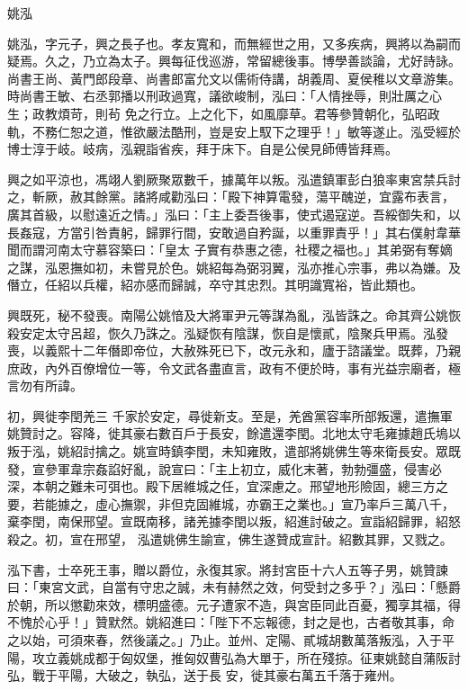
\begin{pinyinscope}

 姚泓



 姚泓，字元子，興之長子也。孝友寬和，而無經世之用，又多疾病，興將以為嗣而疑焉。久之，乃立為太子。興每征伐巡游，常留總後事。博學善談論，尤好詩詠。尚書王尚、黃門郎段章、尚書郎富允文以儒術侍講，胡義周、夏侯稚以文章游集。時尚書王敏、右丞郭播以刑政過寬，議欲峻制，泓曰：「人情挫辱，則壯厲之心生；政教煩苛，則茍
 免之行立。上之化下，如風靡草。君等參贊朝化，弘昭政軌，不務仁恕之道，惟欲嚴法酷刑，豈是安上馭下之理乎！」敏等遂止。泓受經於博士淳于岐。岐病，泓親詣省疾，拜于床下。自是公侯見師傅皆拜焉。



 興之如平涼也，馮翊人劉厥聚眾數千，據萬年以叛。泓遣鎮軍彭白狼率東宮禁兵討之，斬厥，赦其餘黨。諸將咸勸泓曰：「殿下神算電發，蕩平醜逆，宜露布表言，廣其首級，以慰遠近之情。」泓曰：「主上委吾後事，使式遏寇逆。吾綏御失和，以長姦寇，方當引咎責躬，歸罪行間，安敢過自矜誕，以重罪責乎！」其右僕射韋華聞而謂河南太守慕容築曰：「皇太
 子實有恭惠之德，社稷之福也。」其弟弼有奪嫡之謀，泓恩撫如初，未嘗見於色。姚紹每為弼羽翼，泓亦推心宗事，弗以為嫌。及僭立，任紹以兵權，紹亦感而歸誠，卒守其忠烈。其明識寬裕，皆此類也。



 興既死，秘不發喪。南陽公姚愔及大將軍尹元等謀為亂，泓皆誅之。命其齊公姚恢殺安定太守呂超，恢久乃誅之。泓疑恢有陰謀，恢自是懷貳，陰聚兵甲焉。泓發喪，以義熙十二年僭即帝位，大赦殊死已下，改元永和，廬于諮議堂。既葬，乃親庶政，內外百僚增位一等，令文武各盡直言，政有不便於時，事有光益宗廟者，極言勿有所諱。



 初，興徙李閏羌三
 千家於安定，尋徙新支。至是，羌酋黨容率所部叛還，遣撫軍姚贊討之。容降，徙其豪右數百戶于長安，餘遣還李閏。北地太守毛雍據趙氏塢以叛于泓，姚紹討擒之。姚宣時鎮李閏，未知雍敗，遣部將姚佛生等來衛長安。眾既發，宣參軍韋宗姦諂好亂，說宣曰：「主上初立，威化末著，勃勃彊盛，侵害必深，本朝之難未可弭也。殿下居維城之任，宜深慮之。邢望地形險固，總三方之要，若能據之，虛心撫禦，非但克固維城，亦霸王之業也。」宣乃率戶三萬八千，棄李閏，南保邢望。宣既南移，諸羌據李閏以叛，紹進討破之。宣詣紹歸罪，紹怒殺之。初，宣在邢望，
 泓遣姚佛生諭宣，佛生遂贊成宣計。紹數其罪，又戮之。



 泓下書，士卒死王事，贈以爵位，永復其家。將封宮臣十六人五等子男，姚贊諫曰：「東宮文武，自當有守忠之誠，未有赫然之效，何受封之多乎？」泓曰：「懸爵於朝，所以懲勸來效，標明盛德。元子遭家不造，與宮臣同此百憂，獨享其福，得不愧於心乎！」贊默然。姚紹進曰：「陛下不忘報德，封之是也，古者敬其事，命之以始，可須來春，然後議之。」乃止。並州、定陽、貳城胡數萬落叛泓，入于平陽，攻立義姚成都于匈奴堡，推匈奴曹弘為大單于，所在殘掠。征東姚懿自蒲阪討弘，戰于平陽，大破之，執弘，送于長
 安，徙其豪右萬五千落于雍州。




\end{pinyinscope}
